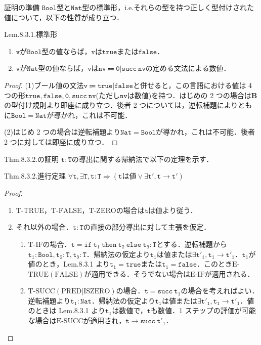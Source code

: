 \documentclass[9pt]{beamer}
\begin{document}
\begin{frame}{証明の準備}
$\mathtt{Bool}$型と$\mathtt{Nat}$型の標準形，i.e.それらの型を持つ正しく型付けされた値について，以下の性質が成り立つ．
\begin{dblock}{Lem.8.3.1.標準形}
	\begin{enumerate}
		\item $\mathtt{v}$が$\mathtt{Bool}$型の値ならば，$\mathtt{v}$は$\mathtt{true}$または$\mathtt{false}$．
		\item $\mathtt{v}$が$\mathtt{Nat}$型の値ならば，$\mathtt{v}$は$\mathtt{nv\Coloneq 0|succ\ nv}$の定める文法による数値．
	\end{enumerate}
\end{dblock}
	\begin{proof}
	(1)ブール値の文法$\mathtt{v\Coloneq true|false}$と併せると，この言語における値は 4 つの形$\mathtt{true, false, 0, succ\ nv}$(ただし$\mathtt{nv}$は数値)を持つ．はじめの 2 つの場合は$\mathbf{B}$の型付け規則より即座に成り立つ．後者 2 つについては，逆転補題によりともに$\mathtt{Bool = Nat}$が導かれ，これは不可能．
	
	(2)はじめ 2 つの場合は逆転補題より$\mathtt{Nat = Bool}$が導かれ，これは不可能．後者 2 つに対しては即座に成り立つ．
	\end{proof}
\end{frame}
\begin{frame}{Thm.8.3.2.の証明}
	$\mathtt{t:T}$の導出に関する帰納法で以下の定理を示す．
	\begin{dblock}{Thm.8.3.2.進行定理}
		$\forall \mathtt{t},\exists\mathtt{T}, \mathtt{t:T}\Rightarrow (\mathtt{t}\text{は値}\lor\exists \mathtt{t'}, \mathtt{t\rightarrow t'})$
		\end{dblock}
\begin{proof}\begin{enumerate}
	\item$\mathrm{T}$-$\mathrm{TRUE}$，$\mathrm{T}$-$\mathrm{FALSE}$，$\mathrm{T}$-$\mathrm{ZERO}$の場合は$\mathtt{t}$は値より従う．
	\item それ以外の場合．$\mathtt{t:T}$の直接の部分導出に対して主張を仮定．\begin{enumerate}
		\item $\mathrm{T}$-$\mathrm{IF}$の場合．$\mathtt{t = if\ t_{1}\ then\ t_{2}\ else\ t_{3}:T}$とする．逆転補題から$\mathtt{t_{1}:Bool, t_{2}:T,t_{3}:T}$．帰納法の仮定より$\mathtt{t_{1}}$は値または$\exists \mathtt{t'_{1}, t_{1}\rightarrow t'_{1}}$．$\mathtt{t_{1}}$が値のとき，Lem.8.3.1 より$\mathtt{t_{1} = true}$または$\mathtt{t_{1} = false}$．このとき$\mathrm{E}$-$\mathrm{TRUE(FALSE)}$が適用できる．そうでない場合は$\mathrm{E}$-$\mathrm{IF}$が適用される．
		\item $\mathrm{T}$-$\mathrm{SUCC(PRED|ISZERO)}$の場合．$\mathtt{t = succ\ t_{1}}$の場合を考えればよい．逆転補題より$\mathtt{t_{1}:Nat}$．帰納法の仮定より$\mathtt{t_{1}}$は値または$\exists \mathtt{t'_{1}, t_{1}\rightarrow t'_{1}}$．値のときは Lem.8.3.1 より$\mathtt{t_{1}}$は数値で，$\mathtt{t}$も数値．1 ステップの評価が可能な場合は$\mathrm{E}$-$\mathrm{SUCC}$が適用され，$\mathtt{t\rightarrow succ\ t'_{1}}$．
	\end{enumerate}
\end{enumerate}
\end{proof}
\end{frame}
\end{document}
